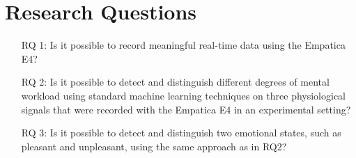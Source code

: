 \section{Research Questions}
\begin{center}
\begin{enumerate}
\item[RQ 1:] Is it possible to record meaningful real-time data using the Empatica E4?
\item[RQ 2:] Is it possible to detect and distinguish different degrees of mental workload using standard machine learning techniques on three physiological signals that were recorded with the Empatica E4 in an experimental setting?
\item[RQ 3:] Is it possible to detect and distinguish two emotional states, such as pleasant and unpleasant, using the same approach as in RQ2?
\end{enumerate}
\end{center}

